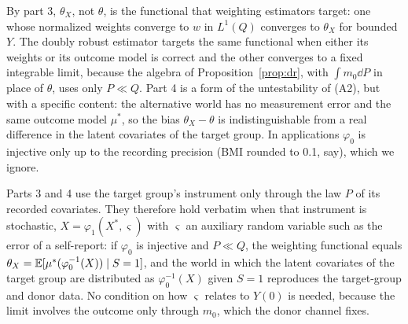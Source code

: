 By part 3, $\theta_X$, not $\theta$, is the functional that weighting estimators target: one whose normalized weights converge to $w$ in $L^1(Q)$ converges to $\theta_X$ for bounded $Y$. The doubly robust estimator targets the same functional when either its weights or its outcome model is correct and the other converges to a fixed integrable limit, because the algebra of Proposition~\ref{prop:dr}, with $\int m_0\dd P$ in place of $\theta$, uses only $P\ll Q$. Part 4 is a form of the untestability of (A2), but with a specific content: the alternative world has no measurement error and the same outcome model $\mu^*$, so the bias $\theta_X-\theta$ is indistinguishable from a real difference in the latent covariates of the target group. In applications $\varphi_0$ is injective only up to the recording precision (BMI rounded to 0.1, say), which we ignore.

\begin{remark}\label{rem:stochastic}
Parts 3 and 4 use the target group's instrument only through the law $P$ of its recorded covariates. They therefore hold verbatim when that instrument is stochastic, $X=\varphi_1(X^*,\varsigma)$ with $\varsigma$ an auxiliary random variable such as the error of a self-report: if $\varphi_0$ is injective and $P\ll Q$, the weighting functional equals $\theta_X=\mathbb{E}[\mu^*(\varphi_0^{-1}(X))\mid S=1]$, and the world in which the latent covariates of the target group are distributed as $\varphi_0^{-1}(X)$ given $S=1$ reproduces the target-group and donor data. No condition on how $\varsigma$ relates to $Y(0)$ is needed, because the limit involves the outcome only through $m_0$, which the donor channel fixes.
\end{remark}

